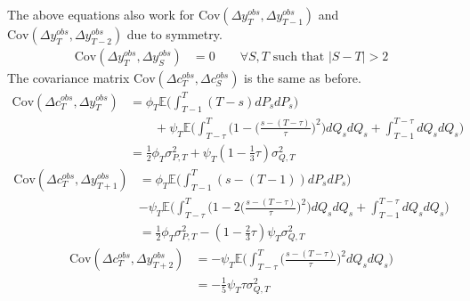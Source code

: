 The above equations also work for $\mathrm{Cov}(\Delta y^{obs}_T, \Delta y^{obs}_{T-1})$ and $\mathrm{Cov}(\Delta y^{obs}_T, \Delta y^{obs}_{T-2})$ due to symmetry.
\begin{align}
\mathrm{Cov}(\Delta y^{obs}_T, \Delta y^{obs}_{S}) &= 0 \qquad \forall S,T \text{ such that }|S-T| >2 
\end{align}
The covariance matrix $\mathrm{Cov}(\Delta c^{obs}_T, \Delta c^{obs}_{S})$ is the same as before.
\begin{align}
\mathrm{Cov}(\Delta c^{obs}_T, \Delta y^{obs}_T) &= \phi_T \mathbb{E} \Big(  \int_{T-1}^{T} (T-s) dP_s dP_s \Big) \nonumber \\
& \qquad +  \psi_T \mathbb{E} \Big(\int_{T-\tau}^{T} \Big( 1 - \Big(\frac{s-(T-\tau)}{\tau}\Big)^2\Big) dQ_s dQ_s  + \int_{T-1}^{T-\tau} dQ_s dQ_s\Big) \nonumber \\
&= \frac{1}{2} \phi_T \sigma^2_{P,T} + \psi_T  (1-\frac{1}{3}\tau )\sigma^2_{Q,T} 
\end{align}
\begin{align}
\mathrm{Cov}(\Delta c^{obs}_T, \Delta y^{obs}_{T+1}) &=  \phi_T \mathbb{E} \Big(  \int_{T-1}^{T} (s-(T-1)) dP_s dP_s \Big) \nonumber \\
&  -\psi_T \mathbb{E} \Big(  \int_{T-\tau}^{T}\Big( 1 - 2\Big(\frac{s-(T-\tau)}{\tau}\Big)^2\Big)  dQ_s dQ_s + \int_{T-1}^{T-\tau}  dQ_s dQ_s \Big) \nonumber \\
&= \frac{1}{2} \phi_T \sigma^2_{P,T} - (1-\frac{2}{3}\tau) \psi_T \sigma^2_{Q,T} 
\end{align}
\begin{align}
\mathrm{Cov}(\Delta c^{obs}_T, \Delta y^{obs}_{T+2}) &=  -\psi_T \mathbb{E} \Big(  \int_{T-\tau}^{T} \Big(\frac{s-(T-\tau)}{\tau}\Big)^2 dQ_s dQ_s\Big) \nonumber \\
&= -\frac{1}{5}\psi_T  \tau \sigma^2_{Q,T}
\end{align}